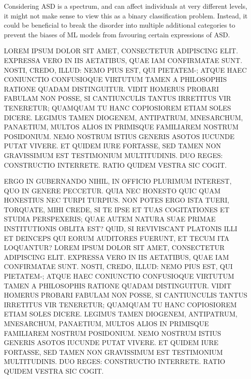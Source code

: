 \documentclass[letterpaper]{article}
\begin{document}
Considering ASD is a spectrum, and can affect individuals at very different levels, it might not make sense to view this as a binary classification problem.
Instead, it could be beneficial to break the disorder into multiple additional categories to prevent the biases of ML models from favouring certain expressions of ASD.




LOREM IPSUM DOLOR SIT AMET, CONSECTETUR ADIPISCING ELIT. EXPRESSA VERO IN IIS AETATIBUS, QUAE IAM CONFIRMATAE SUNT. NOSTI, CREDO, ILLUD: NEMO PIUS EST, QUI PIETATEM-; ATQUE HAEC CONIUNCTIO CONFUSIOQUE VIRTUTUM TAMEN A PHILOSOPHIS RATIONE QUADAM DISTINGUITUR. VIDIT HOMERUS PROBARI FABULAM NON POSSE, SI CANTIUNCULIS TANTUS IRRETITUS VIR TENERETUR; QUAMQUAM TU HANC COPIOSIOREM ETIAM SOLES DICERE. LEGIMUS TAMEN DIOGENEM, ANTIPATRUM, MNESARCHUM, PANAETIUM, MULTOS ALIOS IN PRIMISQUE FAMILIAREM NOSTRUM POSIDONIUM. NEMO NOSTRUM ISTIUS GENERIS ASOTOS IUCUNDE PUTAT VIVERE. ET QUIDEM IURE FORTASSE, SED TAMEN NON GRAVISSIMUM EST TESTIMONIUM MULTITUDINIS. DUO REGES: CONSTRUCTIO INTERRETE. RATIO QUIDEM VESTRA SIC COGIT.

ERGO IN GUBERNANDO NIHIL, IN OFFICIO PLURIMUM INTEREST, QUO IN GENERE PECCETUR. QUIA NEC HONESTO QUIC QUAM HONESTIUS NEC TURPI TURPIUS. NON POTES ERGO ISTA TUERI, TORQUATE, MIHI CREDE, SI TE IPSE ET TUAS COGITATIONES ET STUDIA PERSPEXERIS; QUAE AUTEM NATURA SUAE PRIMAE INSTITUTIONIS OBLITA EST? QUID, SI REVIVISCANT PLATONIS ILLI ET DEINCEPS QUI EORUM AUDITORES FUERUNT, ET TECUM ITA LOQUANTUR?
LOREM IPSUM DOLOR SIT AMET, CONSECTETUR ADIPISCING ELIT. EXPRESSA VERO IN IIS AETATIBUS, QUAE IAM CONFIRMATAE SUNT. NOSTI, CREDO, ILLUD: NEMO PIUS EST, QUI PIETATEM-; ATQUE HAEC CONIUNCTIO CONFUSIOQUE VIRTUTUM TAMEN A PHILOSOPHIS RATIONE QUADAM DISTINGUITUR. VIDIT HOMERUS PROBARI FABULAM NON POSSE, SI CANTIUNCULIS TANTUS IRRETITUS VIR TENERETUR; QUAMQUAM TU HANC COPIOSIOREM ETIAM SOLES DICERE. LEGIMUS TAMEN DIOGENEM, ANTIPATRUM, MNESARCHUM, PANAETIUM, MULTOS ALIOS IN PRIMISQUE FAMILIAREM NOSTRUM POSIDONIUM. NEMO NOSTRUM ISTIUS GENERIS ASOTOS IUCUNDE PUTAT VIVERE. ET QUIDEM IURE FORTASSE, SED TAMEN NON GRAVISSIMUM EST TESTIMONIUM MULTITUDINIS. DUO REGES: CONSTRUCTIO INTERRETE. RATIO QUIDEM VESTRA SIC COGIT.
\end{document}

